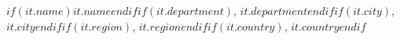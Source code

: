$if(it.name)$$it.name$$endif$$if(it.department)$, $it.department$$endif$$if(it.city)$, $it.city$$endif$$if(it.region)$, $it.region$$endif$$if(it.country)$, $it.country$$endif$